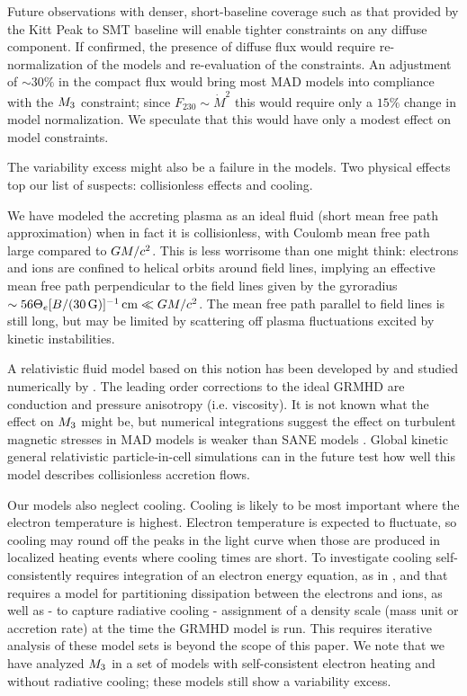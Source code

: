 Future observations with denser, short-baseline coverage such as that provided by the Kitt Peak to SMT baseline will enable tighter constraints on any diffuse component.  If confirmed, the presence of diffuse flux would require re-normalization of the models and re-evaluation of the constraints.  An adjustment of $\sim 30\%$ in the compact flux would bring most MAD models into compliance with the $M_{3}$ constraint; since $F_{230} \sim \dot{M}^2$ this would require only a $15\%$ change in model normalization.  We speculate that this would have only a modest effect on model constraints.

The variability excess might also be a failure in the models.  Two physical effects top our list of suspects: collisionless effects and cooling.

We have modeled the accreting plasma as an ideal fluid (short mean free path approximation) when in fact it is collisionless, with Coulomb mean free path large compared to $GM/c^2$.  This is less worrisome than one might think: electrons and ions are confined to helical orbits around field lines, implying an effective mean free path perpendicular to the field lines given by the gyroradius $\sim 56 \Theta_e [B/(30\,\mathrm{G})]^{-1} \,\mathrm{cm} \ll GM/c^2$.  The mean free path parallel to field lines is still long, but may be limited by scattering off plasma fluctuations excited by kinetic instabilities.

A relativistic fluid model based on this notion has been developed by \citet{2015ApJ...810..162C} and studied numerically by \citet{2017MNRAS.470.2240F}.  The leading order corrections to the ideal GRMHD are conduction and pressure anisotropy (i.e. viscosity).  It is not known what the effect on $M_{3}$ might be, but numerical integrations suggest the effect on turbulent magnetic stresses in MAD models is weaker than SANE models \citep{2017MNRAS.470.2240F}.  Global kinetic general relativistic particle-in-cell simulations can in the future test how well this model describes collisionless accretion flows.

Our models also neglect cooling.  Cooling is likely to be most important where the electron temperature is highest.  Electron temperature is expected to fluctuate, so cooling may round off the peaks in the light curve when those are produced in localized heating events where cooling times are short.  To investigate cooling self-consistently requires integration of an electron energy equation, as in \cite{2015MNRAS.454.1848R}, and that requires a model for partitioning dissipation between the electrons and ions, as well as - to capture radiative cooling - assignment of a density scale (mass unit or accretion rate) at the time the GRMHD model is run.  This requires iterative analysis of these model sets is beyond the scope of this paper.  We note that we have analyzed $M_{3}$ in a set of models with self-consistent electron heating and without radiative cooling; these models still show a variability excess.

